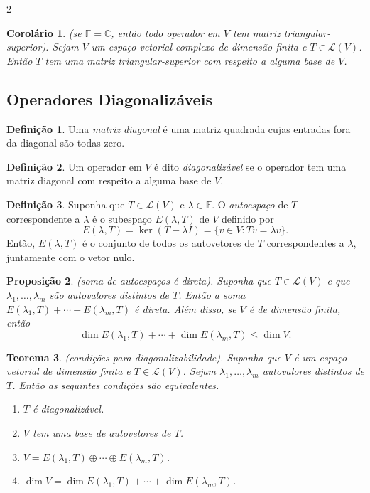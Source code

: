 \documentclass{article}
\theoremstyle{plain}
\newtheorem{thm}{Teorema}[section]
\newtheorem{prop}[thm]{Proposição}
\newtheorem{cor}[thm]{Corolário}
\theoremstyle{definition}
\newtheorem{defn}{Definição}[section]
\theoremstyle{remark}
\begin{document}
\begin{multicols}{2}
\begin{cor} (se \(\mathbb{F}=\mathbb{C}\), então todo operador em \(V\) tem matriz triangular-superior).
    Sejam \(V\) um espaço vetorial complexo de dimensão finita e \(T \in \mathcal{L}(V)\). Então \(T\) tem uma matriz triangular-superior com respeito a alguma base de \(V\).
\end{cor}

\subsection{Operadores Diagonalizáveis}

\begin{defn}
    Uma \emph{matriz diagonal} é uma matriz quadrada cujas entradas fora da diagonal são todas zero.
\end{defn}

\begin{defn}
    Um operador em \(V\) é dito \emph{diagonalizável} se o operador tem uma matriz diagonal com respeito a alguma base de \(V\).
\end{defn}

\begin{defn}
    Suponha que \(T \in \mathcal{L}(V)\) e \(\lambda \in \mathbb{F}\). O \emph{autoespaço} de \(T\) correspondente a \(\lambda\) é o subespaço \(E(\lambda, T)\) de \(V\) definido por
    \[
        E(\lambda, T) = \ker(T - \lambda I) = \{v \in V : Tv = \lambda v\}.
    \]
    \noindent Então, \(E(\lambda, T)\) é o conjunto de todos os autovetores de \(T\) correspondentes a \(\lambda\), juntamente com o vetor nulo.
\end{defn}

\begin{prop} (soma de autoespaços é direta).
    Suponha que \(T \in \mathcal{L}(V)\) e que \(\lambda_1, \ldots, \lambda_m\) são autovalores distintos de \(T\). Então a soma \(E(\lambda_1, T) + \cdots + E(\lambda_m, T)\) é direta. Além disso, se \(V\) é de dimensão finita, então
    \[
        \dim E(\lambda_1, T) + \cdots + \dim E(\lambda_m, T) \leq \dim V.
    \]
\end{prop}

\begin{thm} (condições para diagonalizabilidade).
    Suponha que \(V\) é um espaço vetorial de dimensão finita e \(T \in \mathcal{L}(V)\). Sejam \(\lambda_1,\ldots,\lambda_m\) autovalores distintos de \(T\). Então as seguintes condições são equivalentes.
    \begin{enumerate}
        \item[\textup{(a)}] \(T\) é diagonalizável.
        \item[\textup{(b)}] \(V\) tem uma base de autovetores de \(T\).
        \item[\textup{(c)}] \(V = E(\lambda_1, T) \oplus \cdots \oplus E(\lambda_m, T)\).
        \item[\textup{(d)}] \(\dim V = \dim E(\lambda_1, T) + \cdots + \dim E(\lambda_m, T)\).
    \end{enumerate}
\end{thm}


\end{multicols}
\end{document}

